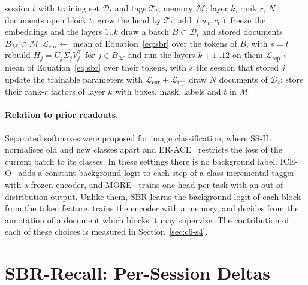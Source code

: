 \begin{algorithm}[!htbp]
  \caption{One session of CoLaR-SBR}
  \label{alg:colarsbr}
  \begin{algorithmic}[1]
    \Require session $t$ with training set $\mathcal{D}_t$ and tags $\mathcal{T}_t$; memory $\mathcal{M}$; layer $k$, rank $r$, $N$ documents
     open block $t$: grow the head by $\mathcal{T}_t$, add $(w_t,c_t)$ \EndIf
     freeze the embeddings and the layers $1..k$ \EndIf
      \State draw a batch $B\subset\mathcal{D}_t$ and stored documents $B_{\mathcal{M}}\subset\mathcal{M}$
      \State $\mathcal{L}_{\text{cur}}\gets$ mean of Equation~\eqref{eq:sbr} over the tokens of $B$, with $s=t$
      \State rebuild $H_j=U_j\Sigma_jV_j^{\top}$ for $j\in B_{\mathcal{M}}$ and run the layers $k{+}1..12$ on them
      \State $\mathcal{L}_{\text{rep}}\gets$ mean of Equation~\eqref{eq:sbr} over their tokens, with $s$ the session that stored $j$
      \State update the trainable parameters with $\mathcal{L}_{\text{cur}}+\mathcal{L}_{\text{rep}}$
    \EndFor
    \State draw $N$ documents of $\mathcal{D}_t$; store their rank-$r$ factors of layer $k$ with boxes, mask, labels and $t$ in $\mathcal{M}$
  \end{algorithmic}
\end{algorithm}

\paragraph{Relation to prior readouts.} Separated softmaxes were proposed for image
classification, where SS-IL~\citep{ahn2021ssil} normalises old and new classes apart and
ER-ACE~\citep{caccia2022erace} restricts the loss of the current batch to its classes. In
these settings there is no background label. ICE-O~\citep{liu2023ice} adds a constant
background logit to each step of a class-incremental tagger with a frozen encoder, and
MORE~\citep{kim2022more} trains one head per task with an out-of-distribution output.
Unlike them, SBR learns the background logit of each block from the token feature, trains
the encoder with a memory, and decides from the annotation of a document which blocks it may
supervise. The contribution of each of these choices is measured in
Section~\ref{sec:c6-s4}.

\section{SBR-Recall: Per-Session Deltas}
\label{sec:m-recall}

